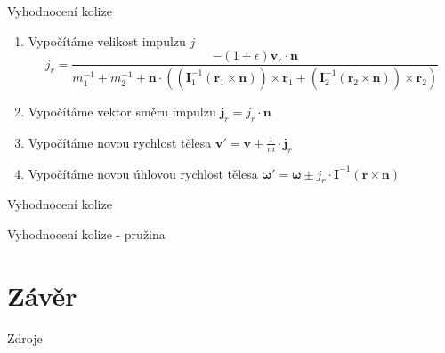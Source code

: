 \documentclass[aspectratio=169,xcolor=dvipsnames]{beamer}
\begin{document}
\begin{frame}{Vyhodnocení kolize}
  \begin{enumerate}
    \item Vypočítáme velikost impulzu $j$
      \begin{equation}
        j_r = \frac{-(1 + \epsilon) \mathbf{v}_r \cdot \mathbf{n}}{m_1^{-1} +
          m_2^{-1} + \mathbf{n} \cdot \left(
            \left( \mathbf{I}_1^{-1} (\mathbf{r}_1 \times \mathbf{n})
            \right) \times
            \mathbf{r}_1 + \left( \mathbf{I}_2^{-1} (\mathbf{r}_2
            \times \mathbf{n}) \right) \times
            \mathbf{r}_2
        \right)}
      \end{equation}
    \item Vypočítáme vektor směru impulzu $\mathbf{j}_r = j_r \cdot \mathbf{n}$
    \item Vypočítáme novou rychlost tělesa $\mathbf{v'} = \mathbf{v}
      \pm \frac{1}{m} \cdot \mathbf{j}_r$
    \item Vypočítáme novou úhlovou rychlost tělesa
      $\mathbf{\omega'} = \mathbf{\omega} \pm j_r \cdot
      \mathbf{I}^{-1}(\mathbf{r} \times \mathbf{n})$
  \end{enumerate}
  \vspace{0.25cm}
  \cite{wikipedia_collision_response}
  \cite{vimmr}
  \cite{leitner2019}
  \cite{kopcil_trejbalova}
\end{frame}
\begin{frame}{Vyhodnocení kolize}
  \centering
\end{frame}
\begin{frame}{Vyhodnocení kolize - pružina}
  \centering
\end{frame}
\section{Závěr}
\begin{frame}[allowframebreaks] {Zdroje}
  \footnotesize
  
  
\end{frame}
\end{document}
